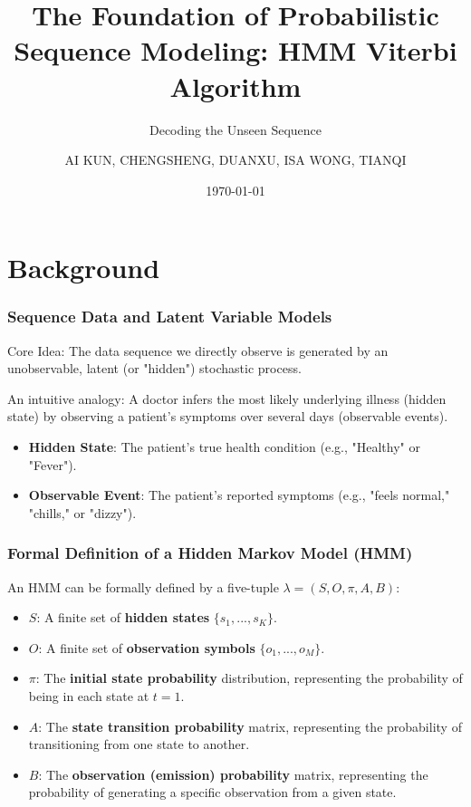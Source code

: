 \documentclass[aspectratio=43, 9pt]{beamer}
\title{The Foundation of Probabilistic Sequence Modeling: HMM Viterbi Algorithm}
\subtitle{Decoding the Unseen Sequence}
\author{AI KUN,  CHENGSHENG, DUANXU, ISA WONG, TIANQI}
\institute{ }
\date{\today}
\begin{document}
\begin{frame}
    \titlepage
\end{frame}

\section{Background}
\begin{frame}
    \frametitle{Sequence Data and Latent Variable Models}
    \begin{Takeaway}
        Core Idea: The data sequence we directly observe is generated by an unobservable, latent (or "hidden") stochastic process.
    \end{Takeaway}
    
    \vspace{1em}
    
    An intuitive analogy: A doctor infers the most likely underlying illness (hidden state) by observing a patient's symptoms over several days (observable events).
    \begin{itemize}
        \item \textbf{Hidden State}: The patient's true health condition (e.g., "Healthy" or "Fever").
        \item \textbf{Observable Event}: The patient's reported symptoms (e.g., "feels normal," "chills," or "dizzy").
    \end{itemize}
\end{frame}

\begin{frame}
    \frametitle{Formal Definition of a Hidden Markov Model (HMM)}
    \begin{NewDefinition}
        An HMM can be formally defined by a five-tuple $\lambda = (S, O, \pi, A, B)$:
        \begin{itemize}
            \item $S$: A finite set of \textbf{hidden states} $\{s_1,..., s_K\}$.
            \item $O$: A finite set of \textbf{observation symbols} $\{o_1,..., o_M\}$.
            \item $\pi$: The \textbf{initial state probability} distribution, representing the probability of being in each state at $t=1$.
            \item $A$: The \textbf{state transition probability} matrix, representing the probability of transitioning from one state to another.
            \item $B$: The \textbf{observation (emission) probability} matrix, representing the probability of generating a specific observation from a given state.
        \end{itemize}
    \end{NewDefinition}
\end{frame}
\end{document}
